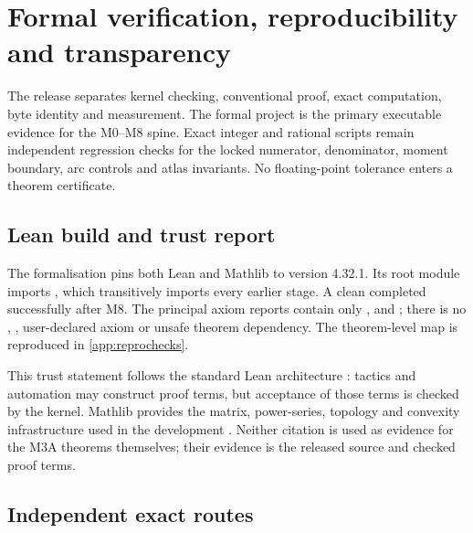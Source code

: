 \section{Formal verification, reproducibility and transparency}
\label{sec:repro}

The release separates kernel checking, conventional proof, exact computation,
byte identity and measurement.  The formal project is the primary executable
evidence for the M0--M8 spine.  Exact integer and rational scripts remain
independent regression checks for the locked numerator, denominator, moment
boundary, arc controls and atlas invariants.  No floating-point tolerance
enters a theorem certificate.

\subsection{Lean build and trust report}

The formalisation pins both Lean and Mathlib to version 4.32.1.  Its root module
imports , which transitively imports every earlier
stage.  A clean  completed successfully after M8.  The
principal axiom reports contain only ,
 and ; there is no
, , user-declared axiom or unsafe theorem dependency.
The theorem-level map is reproduced in \cref{app:reprochecks}.

This trust statement follows the standard Lean architecture
\parencite{deMouraUllrich2021}: tactics and automation may construct proof
terms, but acceptance of those terms is checked by the kernel.  Mathlib
provides the matrix, power-series, topology and convexity infrastructure used
in the development \parencite{MathlibCommunity2020}.  Neither citation is used
as evidence for the M3A theorems themselves; their evidence is the released
source and checked proof terms.

\subsection{Independent exact routes}

